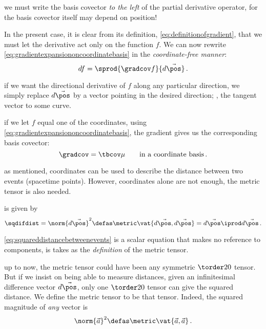  we must write the basis covector \emph{to the left} of the partial derivative operator, for the basis covector itself may depend on position! 

 In the present case, it is clear from its definition, \cref{eq:definitionofgradient}, that we must let the derivative act only on the function $f$. We can now rewrite \cref{eq:gradientexpansiononcoordinatebasis} in the \emph{coordinate-free manner}:
%
\begin{equation}\label{eq:coordinatefreegradient}
  df = \sprod{\gradcov f}{d\vec\pos}\,.
\end{equation}

 if we want the directional derivative of $f$ along any particular direction, we simply replace $d\vec\pos$ by a vector pointing in the desired direction; \eg, the tangent vector to some curve.

 if we let $f$ equal one of the coordinates, using \cref{eq:gradientexpansiononcoordinatebasis}, the gradient gives us the corresponding basis covector:
%
\begin{equation}\label{eq:coordinatebasiselements}
  \gradcov = \tbcov\mu\qquad\text{in a coordinate basis}\,.
\end{equation}

 as mentioned, coordinates can be used to describe the distance between two events (spacetime points). However, coordinates alone are not enough, the metric tensor is also needed.

 is given by
%
\begin{equation}\label{eq:squareddistancebetweenevents}
  \sqdifdist = \norm{d\vec\pos}^2
             \defas \metric\vat{d\vec\pos,d\vec\pos}
             = d\vec\pos\iprod d\vec\pos\,.
\end{equation}

 \cref{eq:squareddistancebetweenevents} is a scalar equation that makes no reference to components, is takes as the \emph{definition} of the metric tensor.

 up to now, the metric tensor could have been any symmetric $\torder 20$ tensor. But if we insist on being able to measure distances, given an infinitesimal difference vector $d\vec\pos$, only one $\torder 20$ tensor can give the squared distance. We define the metric tensor to be that tensor. Indeed, the squared magnitude of \emph{any} vector is
%
\begin{equation*}
  \norm{\vec a}^2 \defas \metric\vat{\vec a, \vec a}\,.
\end{equation*}

